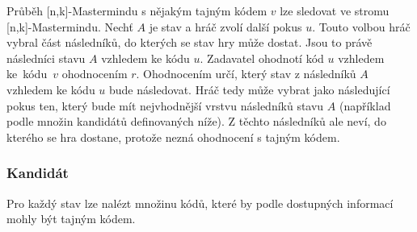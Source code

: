 Průběh [n,k]-Mastermindu s nějakým tajným kódem $v$ lze sledovat ve stromu [n,k]-Mastermindu. Nechť $A$ je stav a hráč zvolí další pokus $u$. Touto volbou hráč vybral část následníků, do kterých se stav hry může dostat. Jsou to právě následníci stavu $A$ vzhledem ke kódu $u$. Zadavatel ohodnotí kód $u$ vzhledem ke~kódu~$v$ ohodnocením $r$. Ohodnocením určí, který stav z následníků $A$ vzhledem ke kódu $u$ bude následovat. Hráč tedy může vybrat jako následující pokus ten, který bude mít nejvhodnější vrstvu následníků stavu $A$ (například podle množin kandidátů definovaných níže). Z těchto následníků ale neví, do kterého se hra dostane, protože nezná ohodnocení s tajným kódem. 


\subsubsection{Kandidát}
Pro každý stav lze nalézt množinu kódů, které by podle dostupných informací mohly být tajným kódem. 

